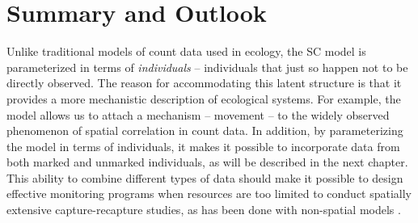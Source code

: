 \section{Summary and Outlook}

Unlike traditional models of count data used in ecology, the SC model
is parameterized in terms of \textit{individuals} -- individuals that just so
happen not to be directly observed. The reason for accommodating this
latent structure is that it provides a more mechanistic description
of ecological systems. For example, the model allows us to attach a
mechanism -- movement -- to the widely observed phenomenon of spatial
correlation in count data. In addition, by parameterizing the model in
terms of individuals, it makes it possible to incorporate data from
both marked and unmarked individuals, as will be described in the next
chapter. This ability to combine different
types of data should make it possible to
design effective monitoring programs when resources are too limited to
conduct spatially extensive capture-recapture
studies, as has been done
with non-spatial models \citep{conroy_etal:2008}.

